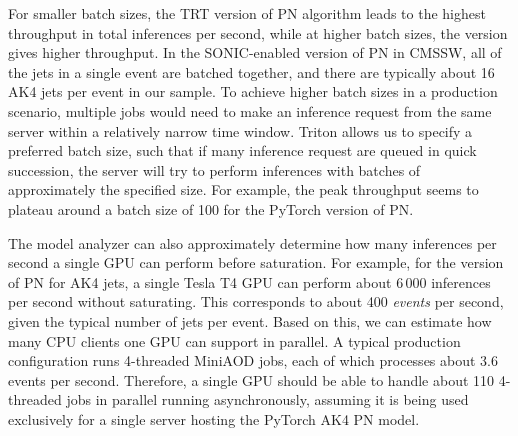 For smaller batch sizes, the TRT version of PN algorithm leads to the highest throughput in total inferences per second, while at higher batch sizes, the \PYTORCH version gives higher throughput. In the SONIC-enabled version of PN in CMSSW, all of the jets in a single event are batched together, and there are typically about 16 AK4 jets per event in our \ttbar sample. To achieve higher batch sizes in a production scenario, multiple jobs would need to make an inference request from the same server within a relatively narrow time window. Triton allows us to specify a preferred batch size, such that if many inference request are queued in quick succession, the server will try to perform inferences with batches of approximately the specified size. For example, the peak throughput seems to plateau around a batch size of 100 for the PyTorch version of PN.%

The model analyzer can also approximately determine how many inferences per second a single GPU can perform before saturation. For example, for the \PYTORCH version of PN for AK4 jets, a single Tesla T4 GPU can perform about 6\,000 inferences per second without saturating. This corresponds to about 400 \textit{events} per second, given the typical number of jets per event.
Based on this, we can estimate how many CPU clients one GPU can support in parallel. A typical production configuration runs 4-threaded MiniAOD jobs, each of which processes about 3.6 events per second. Therefore, a single GPU should be able to handle about 110 4-threaded jobs in parallel running asynchronously, assuming it is being used exclusively for a single server hosting the PyTorch AK4 PN model.

